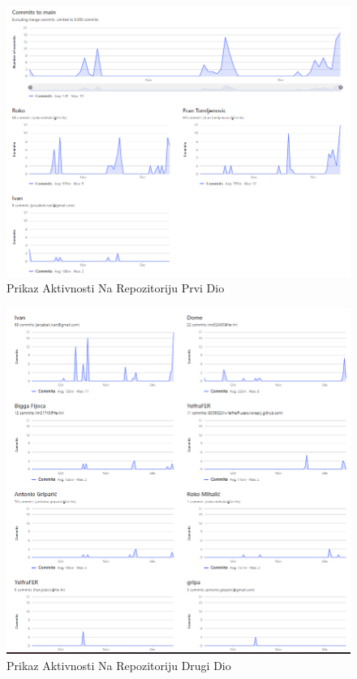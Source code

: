 		\begin{figure}[H]
			\includegraphics[width=\textwidth]{slike/PrikazAktivnostiNaRepozitorijuPrviDio.png} %
			\caption{Prikaz Aktivnosti Na Repozitoriju Prvi Dio}
			\label{fig:PrikazAktivnostiNaRepozitorijuPrviDio} %
		\end{figure}
		
		\begin{figure}[H]
			\includegraphics[width=\textwidth]{slike/PrikazAktivnostiNaRepozitorijuDrugiDio.png} %
			\caption{Prikaz Aktivnosti Na Repozitoriju Drugi Dio}
			\label{fig:PrikazAktivnostiNaRepozitorijuDrugiDio} %
		\end{figure}
	
		
	